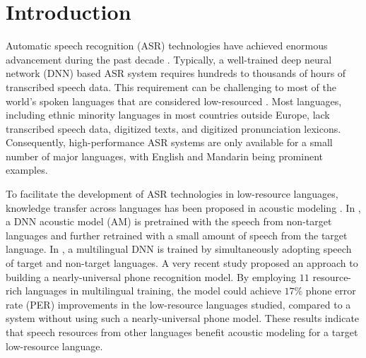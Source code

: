 \documentclass{article}
\begin{document}
\section{Introduction}
\label{sec:intro}

Automatic speech recognition (ASR) technologies have achieved enormous advancement during the past decade \cite{zhang2020Transformer}. 
Typically, a well-trained deep neural network (DNN) based ASR system \cite{ASAPP-ASR} requires hundreds to thousands of hours of transcribed speech data. 
This requirement can be challenging to most of the world's spoken languages that are considered low-resourced  \cite{speech2020scharenborg}. 
Most languages, including ethnic minority languages in most countries outside Europe, 
lack transcribed speech data, digitized texts, and digitized pronunciation lexicons.
Consequently, high-performance ASR systems are only available for a small number of major languages, with English and Mandarin being prominent examples.

To facilitate the development of ASR technologies in low-resource languages, knowledge transfer across languages has been proposed in acoustic modeling \cite{swietojanski2012unsupervised,Huang2013cross,li2020universal}. 
In \cite{swietojanski2012unsupervised}, a DNN acoustic model (AM) is pretrained with the speech from non-target languages and further retrained with a small amount of speech from the target language. In \cite{Huang2013cross}, a multilingual DNN is trained by simultaneously adopting speech of target and non-target languages. 
A very recent study \cite{li2020universal} proposed an approach to building a nearly-universal phone recognition model. By employing $11$ resource-rich languages in multilingual training, the model could achieve $17\%$ phone error rate (PER) improvements in the low-resource languages studied, compared to a system without using such a nearly-universal phone model.
These results indicate that speech resources from other languages benefit acoustic modeling for a target low-resource language.
\end{document}
